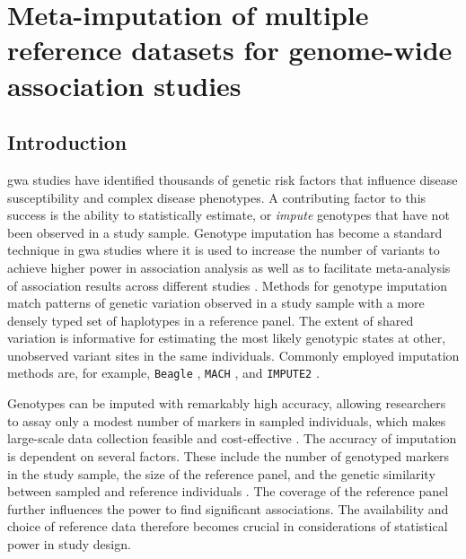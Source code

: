 
\glsresetall




{
\singlespacing
\chapter{Meta-imputation of multiple reference datasets for genome-wide association studies}
\label{ch:metaimpute}
\minitoc
}


%
\section{Introduction}
%


\Gls{gwa} studies have identified thousands of genetic risk factors that influence disease susceptibility and complex disease phenotypes.
A contributing factor to this success is the ability to statistically estimate, or \emph{impute} genotypes that have not been observed in a study sample.
Genotype imputation has become a standard technique in \gls{gwa} studies where it is used to increase the number of variants to achieve higher power in association analysis as well as to facilitate meta-analysis of association results across different studies \citep{Marchini:2007bg, Marchini:2010cga}.
Methods for genotype imputation match patterns of genetic variation observed in a study sample with a more densely typed set of haplotypes in a reference panel.
The extent of shared variation is informative for estimating the most likely genotypic states at other, unobserved variant sites in the same individuals.
Commonly employed imputation methods are, for example, \texttt{Beagle} \citep{Browning:2016iy}, \texttt{MACH} \citep{Li:2010kx}, and \texttt{IMPUTE2} \citep{Howie:2009hq,Howie:2011ia}.

Genotypes can be imputed with remarkably high accuracy, allowing researchers to assay only a modest number of markers in sampled individuals, which makes large-scale data collection feasible and cost-effective \citep{Li:2009kfa}.
The accuracy of imputation is dependent on several factors.
These include the number of genotyped markers in the study sample,
the size of the reference panel, and the genetic similarity between sampled and reference individuals \citep{Howie:2009hq, Roshyara:2015gi}.
The coverage of the reference panel further influences the power to find significant associations.
The availability and choice of reference data therefore becomes crucial in considerations of statistical power in study design.

